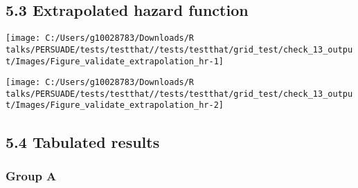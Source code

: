 \documentclass[
]{article}
\begin{document}
\clearpage

\subsection{5.3 Extrapolated hazard
function}\label{extrapolated-hazard-function}

\begin{flushleft}\texttt{[image: C:/Users/g10028783/Downloads/R talks/PERSUADE/tests/testthat//tests/testthat/grid\_test/check\_13\_output/Images/Figure\_validate\_extrapolation\_hr-1]} \end{flushleft}

\begin{flushleft}\texttt{[image: C:/Users/g10028783/Downloads/R talks/PERSUADE/tests/testthat//tests/testthat/grid\_test/check\_13\_output/Images/Figure\_validate\_extrapolation\_hr-2]} \end{flushleft}

\clearpage

\subsection{5.4 Tabulated results}\label{tabulated-results}

\subsubsection{Group A}\label{group-a}
\end{document}
